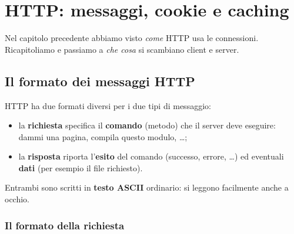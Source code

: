 \chapter{HTTP: messaggi, cookie e caching}

Nel capitolo precedente abbiamo visto \emph{come} HTTP usa le connessioni. Ricapitoliamo e passiamo
a \emph{che cosa} si scambiano client e server.


\section{Il formato dei messaggi HTTP}

HTTP ha due formati diversi per i due tipi di messaggio:

\begin{itemize}
    \item la \textbf{richiesta} specifica il \textbf{comando} (metodo) che il server deve eseguire: dammi
          una pagina, compila questo modulo, \dots;
    \item la \textbf{risposta} riporta l'\textbf{esito} del comando (successo, errore, \dots) ed eventuali
          \textbf{dati} (per esempio il file richiesto).
\end{itemize}

Entrambi sono scritti in \textbf{testo ASCII} ordinario: si leggono facilmente anche a occhio.

\subsection{Il formato della richiesta}


